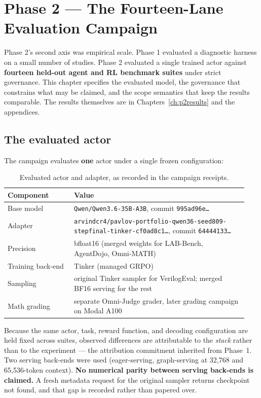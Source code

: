 \chapter{Phase 2 --- The Fourteen-Lane Evaluation Campaign}
\label{ch:campaign}

Phase 2's second axis was empirical scale. Phase 1 evaluated a diagnostic harness
on a small number of studies. Phase 2 evaluated a single trained actor against
\textbf{fourteen held-out agent and RL benchmark suites} under strict governance.
This chapter specifies the evaluated model, the governance that constrains what
may be claimed, and the scope semantics that keep the results comparable. The
results themselves are in Chapters~\ref{ch:p2results} and the appendices.

\section{The evaluated actor}

The campaign evaluates \textbf{one} actor under a single frozen configuration:

\begin{table}[h]
  \centering
  \caption{Evaluated actor and adapter, as recorded in the campaign receipts.}
  \label{tab:actor}
  \small
  \begin{tabular}{@{}L{0.26\linewidth}L{0.68\linewidth}@{}}
    \toprule
    \textbf{Component} & \textbf{Value} \\
    \midrule
    Base model & \texttt{Qwen/Qwen3.6-35B-A3B}, commit \texttt{995ad96e\ldots} \\
    Adapter & \texttt{arvindcr4/pavlov-portfolio-qwen36-seed809-stepfinal-tinker-cf0ad8c1\ldots}, commit \texttt{64444133\ldots} \\
    Precision & bfloat16 (merged weights for LAB-Bench, AgentDojo, Omni-MATH) \\
    Training back-end & Tinker (managed GRPO) \\
    Sampling & original Tinker sampler for VerilogEval; merged BF16 serving for the rest \\
    Math grading & separate Omni-Judge grader, later grading campaign on Modal A100 \\
    \bottomrule
  \end{tabular}
\end{table}

Because the same actor, task, reward function, and decoding configuration are held
fixed across suites, observed differences are attributable to the \emph{stack}
rather than to the experiment --- the attribution commitment inherited from
Phase~1. Two serving back-ends were used (eager-serving, graph-serving at 32{,}768
and 65{,}536-token context). \textbf{No numerical parity between serving back-ends
is claimed.} A fresh metadata request for the original sampler returns checkpoint
not found, and that gap is recorded rather than papered over.


